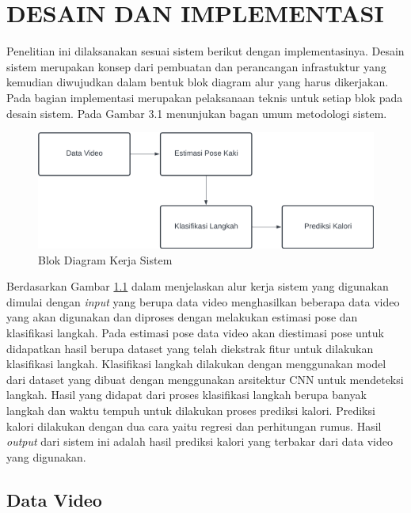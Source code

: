 \chapter{DESAIN DAN IMPLEMENTASI}
\label{chap:desainimplementasi}

Penelitian ini dilaksanakan sesuai sistem berikut dengan implementasinya. Desain sistem merupakan konsep dari pembuatan dan perancangan infrastuktur yang kemudian diwujudkan dalam bentuk blok diagram alur yang harus dikerjakan. Pada bagian implementasi merupakan pelaksanaan teknis untuk setiap blok pada desain sistem. Pada Gambar 3.1 menunjukan bagan umum metodologi sistem.

\begin{figure}[H]
  \centering
  \includegraphics[scale=0.215]{gambar/blok diagram metodologi5.png}
  \caption{Blok Diagram Kerja Sistem}
  \label{fig:BlokDiagram}
\end{figure}

Berdasarkan Gambar \ref{fig:BlokDiagram} dalam menjelaskan alur kerja sistem yang digunakan dimulai dengan \emph{input} yang berupa data video menghasilkan beberapa data video yang akan digunakan dan diproses dengan melakukan estimasi pose dan klasifikasi langkah. Pada estimasi pose data video akan diestimasi pose untuk didapatkan hasil berupa dataset yang telah diekstrak fitur untuk dilakukan klasifikasi langkah. Klasifikasi langkah dilakukan dengan menggunakan model dari dataset yang dibuat dengan menggunakan arsitektur CNN untuk mendeteksi langkah. Hasil yang didapat dari proses klasifikasi langkah berupa banyak langkah dan waktu tempuh untuk dilakukan proses prediksi kalori. Prediksi kalori dilakukan dengan dua cara yaitu regresi dan perhitungan rumus. Hasil \emph{output} dari sistem ini adalah hasil prediksi kalori yang terbakar dari data video yang digunakan.

\section{Data Video}
\label{sec:PengambilanData}

